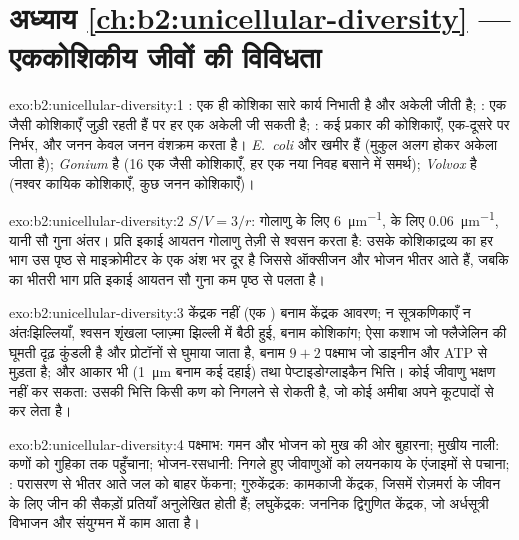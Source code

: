 \section*{अध्याय \ref{ch:b2:unicellular-diversity} --- एककोशिकीय जीवों की विविधता}

\begin{solution}{exo:b2:unicellular-diversity:1}
: एक ही कोशिका सारे कार्य निभाती है और अकेली जीती है;
: एक जैसी कोशिकाएँ जुड़ी रहती हैं पर हर एक अकेली जी सकती है;
: कई प्रकार की कोशिकाएँ, एक-दूसरे पर निर्भर, और जनन केवल
जनन वंशक्रम करता है। \emph{E.~coli} और खमीर  हैं (मुकुल
अलग होकर अकेला जीता है); \emph{Gonium}  है (16 एक जैसी
कोशिकाएँ, हर एक नया निवह बसाने में समर्थ); \emph{Volvox}  है
(नश्वर कायिक कोशिकाएँ, कुछ जनन कोशिकाएँ)।
\end{solution}

\begin{solution}{exo:b2:unicellular-diversity:2}
$S/V = 3/r$: गोलाणु के लिए \qty{6}{\micro m^{-1}},
 के लिए \qty{0.06}{\micro m^{-1}}, यानी सौ गुना अंतर।
प्रति इकाई आयतन गोलाणु तेज़ी से श्वसन करता है: उसके कोशिकाद्रव्य का हर
भाग उस पृष्ठ से माइक्रोमीटर के एक अंश भर दूर है जिससे ऑक्सीजन और भोजन
भीतर आते हैं, जबकि  का भीतरी भाग प्रति इकाई आयतन सौ गुना कम
पृष्ठ से पलता है।
\end{solution}

\begin{solution}{exo:b2:unicellular-diversity:3}
केंद्रक नहीं (एक ) बनाम केंद्रक आवरण; न सूत्रकणिकाएँ न
अंतःझिल्लियाँ, श्वसन शृंखला प्लाज़्मा झिल्ली में बैठी हुई, बनाम
कोशिकांग; ऐसा कशाभ जो फ्लैजेलिन की घूमती दृढ़ कुंडली है और प्रोटॉनों से
घुमाया जाता है, बनाम $9+2$ पक्ष्माभ जो डाइनीन और ATP से मुड़ता है; और
आकार भी (\qty{1}{\micro m} बनाम कई दहाई) तथा पेप्टाइडोग्लाइकैन भित्ति।
कोई जीवाणु भक्षण नहीं कर सकता: उसकी भित्ति किसी कण को निगलने से रोकती
है, जो कोई अमीबा अपने कूटपादों से कर लेता है।
\end{solution}

\begin{solution}{exo:b2:unicellular-diversity:4}
पक्ष्माभ: गमन और भोजन को मुख की ओर बुहारना; मुखीय नाली: कणों को गुहिका
तक पहुँचाना; भोजन-रसधानी: निगले हुए जीवाणुओं को लयनकाय के एंजाइमों से
पचाना; : परासरण से भीतर आते जल को बाहर फेंकना;
गुरुकेंद्रक: कामकाजी केंद्रक, जिसमें रोज़मर्रा के जीवन के लिए जीन की
सैकड़ों प्रतियाँ अनुलेखित होती हैं; लघुकेंद्रक: जननिक द्विगुणित केंद्रक,
जो अर्धसूत्री विभाजन और संयुग्मन में काम आता है।
\end{solution}


